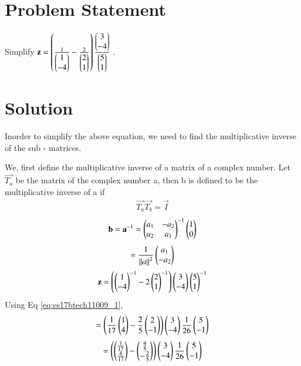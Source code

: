 \documentclass[journal,12pt,twocolumn]{IEEEtran}
\begin{document}
\section{\textbf{Problem Statement}}

Simplify $\mathbf{z} = \left(\frac{1}{\begin{pmatrix} 1 \\ -4 \end{pmatrix}} - \frac{2}{\begin{pmatrix} 2 \\ 1\end{pmatrix}}\right) \frac{\begin{pmatrix} 3 \\ -4 \end{pmatrix}}{\begin{pmatrix} 5 \\ 1 \end{pmatrix}}$ .
%
\section{\textbf{Solution}}
Inorder to simplify the above equation, we need to find the multiplicative inverse of the sub - matrices.

We, first define the multiplicative inverse of a matrix of a complex number.
Let $\vec{T_a}$ be the matrix of the complex number a, then b is defined to be the multiplicative inverse of a if
\begin{align}
    \vec{T_a}\vec{T_b} = \vec{I}
\end{align}
\begin{align}
    \mathbf{b} = \mathbf{a}^{-1} = \begin{pmatrix}a_1 & -a_2 \\ a_2 & a_1\end{pmatrix}^{-1} \begin{pmatrix}1 \\ 0\end{pmatrix} 
\end{align}
\begin{align}
    = \frac{1}{\left\| a\right\|^2}\begin{pmatrix}a_1 \\ -a_2\end{pmatrix}\label{eq:es17btech11009_1}
\end{align}
\begin{align}
    \mathbf{z} = \left(\begin{pmatrix}1 \\ -4\end{pmatrix}^{-1} - 2\begin{pmatrix}2 \\ 1\end{pmatrix}^{-1}\right) \begin{pmatrix}3 \\ -4\end{pmatrix}
     \begin{pmatrix}5 \\ 1\end{pmatrix}^{-1}
\end{align}
Using Eq \eqref{eq:es17btech11009_1},
\begin{align}
    = \left(\frac{1}{17}\begin{pmatrix}1 \\ 4\end{pmatrix} - \frac{2}{5}\begin{pmatrix}2 \\ -1\end{pmatrix}\right)\begin{pmatrix}3 \\ -4\end{pmatrix} \frac{1}{26} \begin{pmatrix}5 \\ -1\end{pmatrix}
\end{align}    
\begin{align}
   = \left(\begin{pmatrix}\frac{1}{17} \\ \frac{4}{17}\end{pmatrix} - \begin{pmatrix}\frac{4}{5} \\ -\frac{2}{5}\end{pmatrix}\right)\begin{pmatrix}3 \\ -4\end{pmatrix} \frac{1}{26} \begin{pmatrix}5 \\ -1\end{pmatrix}
\end{align}
\end{document}
